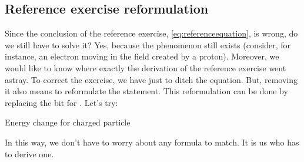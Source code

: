 \subsection{Reference exercise reformulation}
%
Since the conclusion of the reference exercise, \cref{eq:referenceequation}, is wrong, do we still have to solve it? Yes, because the phenomenon still exists (consider, for instance, an electron moving in the field created by a proton). Moreover, we would like to know where exactly the derivation of the reference exercise went astray. To correct the exercise, we have just to ditch the equation. But, removing it also means to reformulate the statement. This reformulation can be done by replacing the  bit for . Let's try:
%
\begin{description}
%
\item[Energy change for charged particle] 
%
\end{description}
%
In this way, we don't have to worry about any formula to match. It is us who has to derive one.


